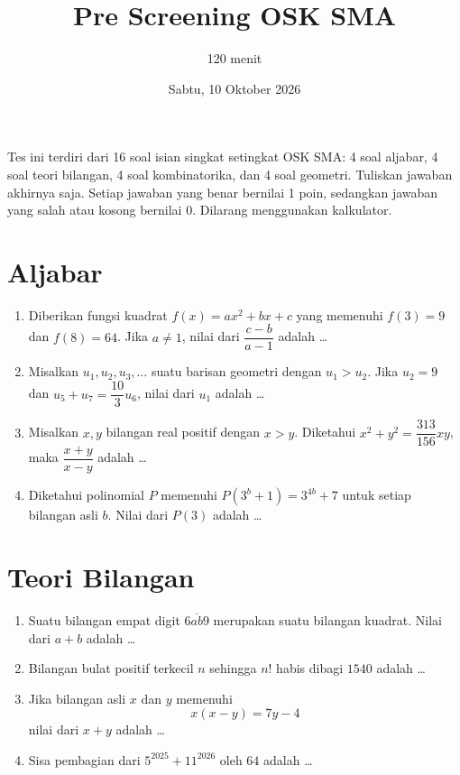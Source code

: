 \documentclass[12pt]{scrartcl}
\title{Pre Screening OSK SMA}
\author{120 menit}
\date{Sabtu, 10 Oktober 2026}
\begin{document}
\maketitle

\noindent Tes ini terdiri dari 16 soal isian singkat setingkat OSK SMA:
4 soal aljabar, 4 soal teori bilangan, 4 soal kombinatorika, dan 4 soal geometri.
Tuliskan jawaban akhirnya saja. Setiap jawaban yang benar bernilai 1 poin,
sedangkan jawaban yang salah atau kosong bernilai 0. Dilarang menggunakan kalkulator.

\section{Aljabar}
\begin{enumerate}
	\item Diberikan fungsi kuadrat $f(x)=ax^{2}+bx+c$ yang memenuhi $f(3)=9$ dan $f(8)=64$.
	Jika $a \ne 1$, nilai dari $\dfrac{c-b}{a-1}$ adalah \dots

	\item Misalkan $u_{1},u_{2},u_{3},\dots$ suatu barisan geometri dengan $u_{1}>u_{2}$.
	Jika $u_{2}=9$ dan $u_{5}+u_{7}=\dfrac{10}{3}u_{6}$, nilai dari $u_{1}$ adalah \dots

	\item Misalkan $x, y$ bilangan real positif dengan $x>y$.
	Diketahui $x^{2}+y^{2}=\dfrac{313}{156}xy$, maka $\dfrac{x+y}{x-y}$ adalah \dots

	\item Diketahui polinomial $P$ memenuhi $P(3^{b}+1)=3^{4b}+7$ untuk setiap bilangan asli $b$.
	Nilai dari $P(3)$ adalah \dots
\end{enumerate}

\section{Teori Bilangan}
\begin{enumerate}[resume]
	\item Suatu bilangan empat digit $\overline{6ab9}$ merupakan suatu bilangan kuadrat.
	Nilai dari $a+b$ adalah \dots

	\item Bilangan bulat positif terkecil $n$ sehingga $n!$ habis dibagi $1540$ adalah \dots

	\item Jika bilangan asli $x$ dan $y$ memenuhi
	\[ x(x-y)=7y-4 \]
	nilai dari $x+y$ adalah \dots

	\item Sisa pembagian dari $5^{2025}+11^{2026}$ oleh $64$ adalah \dots
\end{enumerate}
\end{document}
